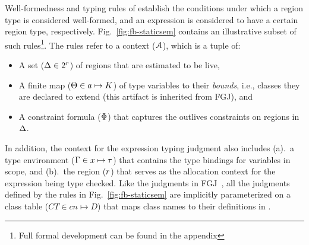 Well-formedness and typing rules of \fbname establish the conditions
under which a region type is considered well-formed, and an expression
is considered to have a certain region type, respectively.
Fig.~\ref{fig:fb-staticsem} contains an illustrative subset of such
rules\footnote{Full formal development can be found in the
appendix}. The rules refer to a context (${\mathcal{A}}$), which is a tuple of:
\begin{itemize}
\item A set ($\Delta \in 2^r$) of regions that are estimated to be
live,
\item A finite map ($\Theta \in a \mapsto K$) of type
variables to their \emph{bounds}, i.e., classes they are declared to
extend (this artifact is inherited from FGJ), and
\item A constraint formula ($\Phi$) that captures the outlives
constraints on regions in $\Delta$.
\end{itemize}
In addition, the context for the expression typing judgment also
includes (a).~a type environment ($\Gamma \in x \mapsto \tau$) that
contains the type bindings for variables in scope, and (b).~the region
($r$) that serves as the allocation context for the expression
being type checked. Like the judgments in FGJ~\cite{fgj}, all the
judgments defined by the rules in Fig.~\ref{fig:fb-staticsem} are
implicitly parameterized on a class table ($CT \in cn \mapsto D$) that
maps class names to their definitions in \FB.




